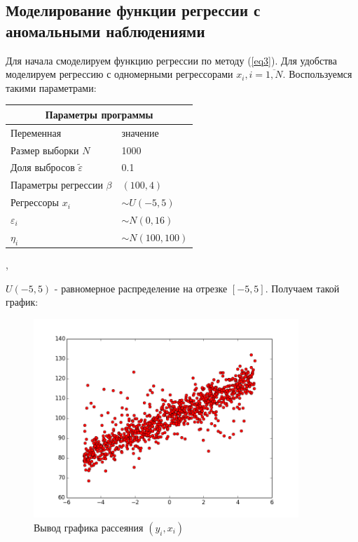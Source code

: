 \documentclass[a4paper,14pt]{extarticle}
\begin{document}
\subsection{Моделирование функции регрессии с аномальными наблюдениями}\label{sec3}
Для начала смоделируем функцию регрессии по методу (\ref{eq3}). Для удобства моделируем регрессию с одномерными регрессорами $x_i, i=\overline{1,N}$.\hfill\break
Воспользуемся такими параметрами:\hfill\break
\begin{center}
\begin{tabular}{|p{5cm}|p{5cm}|}
    \hline
    \multicolumn{2}{|c|}{Параметры программы} \\
    \hline
    Переменная&значение\\
    \hline
    Размер выборки $N$& 1000\\
    \hline
    Доля выбросов $\widetilde{\varepsilon}$& 0.1\\
    \hline
    Параметры регрессии $\beta$& $(100,4)$\\
    \hline
    Регрессоры $x_i$ & $\sim U(-5,5)$\\
    \hline
    $\varepsilon_i$&$\sim N(0,16)$\\
    \hline
    $\eta_i$&$\sim N(100,100)$\\
    \hline
\end{tabular},
\end{center}
$U(-5,5)$ - равномерное распределение на отрезке $[-5,5]$.\hfill\break
Получаем такой график:\hfill\break
\begin{figure}[ht!]
    \centering
    \includegraphics[width=100mm]{pics/graphic.png}
    \caption{Вывод графика рассеяния $(y_i,x_i)$\label{overflow}}
\end{figure}
\end{document}
